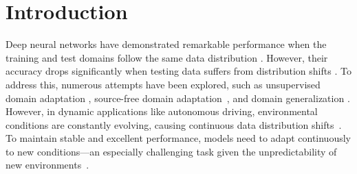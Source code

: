 


\section{Introduction}
\label{sec:intro}


Deep neural networks have demonstrated remarkable performance when the training and test domains follow the same data distribution \cite{lu2022survey}. However, their accuracy drops significantly when testing data suffers from distribution shifts \cite{lu2022survey,liang2024comprehensive}.
To address this, numerous attempts have been explored, such as unsupervised domain adaptation \cite{ge2023unsupervised}, source-free domain adaptation~\cite{li2024comprehensive}, and domain generalization \cite{zhou2022domain}. However, in dynamic applications like autonomous driving, environmental conditions are constantly evolving, causing continuous data distribution shifts~\cite{li2023lwsis,sakaridis2021acdc}. To maintain stable and excellent performance, models need to adapt continuously to new conditions—an especially challenging task given the unpredictability of new environments~\cite{pan2020unsupervised}.  






